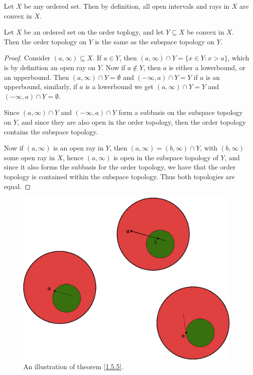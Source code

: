 \begin{example}
    Let $X$ be any ordered set. Then by definition, all open intervals and rays in
    $X$ are convex in  $X$.
\end{example}

\begin{theorem}\label{1.5.5}
    Let $X$ be an ordered set on the order toplogy, and let  $Y \subseteq X$ be convex in  $X$.
    Then the order topology on  $Y$ is the same as the subspace topology on  $Y$.
\end{theorem}
\begin{proof}
    Consider $(a, \infty) \subseteq X$. If  $a \in Y$, then  $(a,\infty) \cap Y=\{x \in Y: x>a\}$,
    which is by definition an open ray on $Y$. Now if  $a \notin Y$, then  $a$ is either a lowerbound, or
    an upperbound. Then  $(a, \infty) \cap Y=\emptyset$ and  $(-\infty,a) \cap Y=Y$ if  $a$ is an
    upperbound, similarly, if  $a$ is a lowerbound we get  $(a, \infty) \cap Y=Y$ and  $(-\infty,a) \cap Y=\emptyset$.

    Since $(a, \infty) \cap Y$ and  $(-\infty,a) \cap Y$ form a subbasis on the subspace topology on  $Y$,
    and since they are also open in  the order topology, then the order topology contains the subspace topology.

    Now if  $(a, \infty)$ is an open ray in  $Y$, then  $(a,\infty)=(b,\infty) \cap Y$, with $(b, \infty)$
    some open ray in  $X$, hence  $(a, \infty)$ is open in the subspace topology of  $Y$, and since
    it also forms the subbasis for the order topology, we have that the order
    topology is contained within the subspace topology. Thus both topologies are
    equal.
\end{proof}

\begin{figure}[h]
    \centering
    \includegraphics[scale = 0.5]{Figures/Chapter1/thm_1_55.eps}
    \caption{An illustration of theorem \ref{1.5.5}.}
    \label{fig1.7}
\end{figure}

